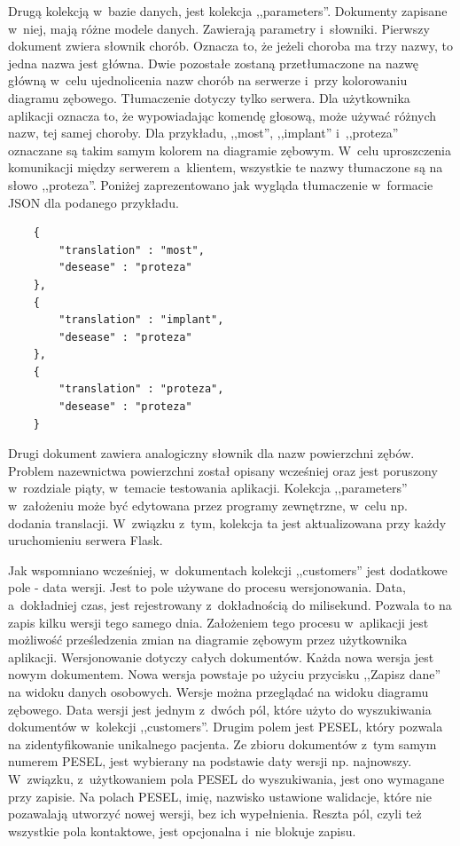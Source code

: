 Drugą kolekcją w~bazie danych, jest kolekcja ,,parameters''. Dokumenty zapisane w~niej, mają różne modele danych. Zawierają parametry i~słowniki. Pierwszy dokument zwiera słownik chorób. Oznacza to, że jeżeli choroba ma trzy nazwy, to jedna nazwa jest główna. Dwie pozostałe zostaną przetłumaczone na nazwę główną w~celu ujednolicenia nazw chorób na serwerze i~przy kolorowaniu diagramu zębowego. Tłumaczenie dotyczy tylko serwera. Dla użytkownika aplikacji oznacza to, że wypowiadając komendę głosową, może używać różnych nazw, tej samej choroby. Dla przykładu, ,,most'', ,,implant'' i~,,proteza'' oznaczane są takim samym kolorem na diagramie zębowym. W~celu uproszczenia komunikacji między serwerem a~klientem, wszystkie te nazwy tłumaczone są na słowo ,,proteza''. Poniżej zaprezentowano jak wygląda tłumaczenie w~formacie JSON dla podanego przykładu.
\begin{lstlisting}
    {
        "translation" : "most",
        "desease" : "proteza"
    }, 
    {
        "translation" : "implant",
        "desease" : "proteza"
    }, 
    {
        "translation" : "proteza",
        "desease" : "proteza"
    }
\end{lstlisting}
Drugi dokument zawiera analogiczny słownik dla nazw powierzchni zębów. Problem nazewnictwa powierzchni został opisany wcześniej oraz jest poruszony w~rozdziale piąty, w~temacie testowania aplikacji.
Kolekcja ,,parameters'' w~założeniu może być edytowana przez programy zewnętrzne, w~celu np. dodania translacji. W~związku z~tym, kolekcja ta jest aktualizowana przy każdy uruchomieniu serwera Flask.

Jak wspomniano wcześniej, w~dokumentach kolekcji ,,customers'' jest dodatkowe pole - data wersji. Jest to pole używane do procesu wersjonowania. Data, a~dokładniej czas, jest rejestrowany z~dokładnością do milisekund. Pozwala to na zapis kilku wersji tego samego dnia. Założeniem tego procesu w~aplikacji jest możliwość prześledzenia zmian na diagramie zębowym przez użytkownika aplikacji. Wersjonowanie dotyczy całych dokumentów. Każda nowa wersja jest nowym dokumentem. Nowa wersja powstaje po użyciu przycisku ,,Zapisz dane'' na widoku danych osobowych. Wersje można przeglądać na widoku diagramu zębowego. Data wersji jest jednym z~dwóch pól, które użyto do wyszukiwania dokumentów w~kolekcji ,,customers''. Drugim polem jest PESEL, który pozwala na zidentyfikowanie unikalnego pacjenta. Ze zbioru dokumentów z~tym samym numerem PESEL, jest wybierany na podstawie daty wersji np. najnowszy. W~związku, z~użytkowaniem pola PESEL do wyszukiwania, jest ono wymagane przy zapisie. Na polach PESEL, imię, nazwisko ustawione walidacje, które nie pozawalają utworzyć nowej wersji, bez ich wypełnienia. Reszta pól, czyli też wszystkie pola kontaktowe, jest opcjonalna i~nie blokuje zapisu.

